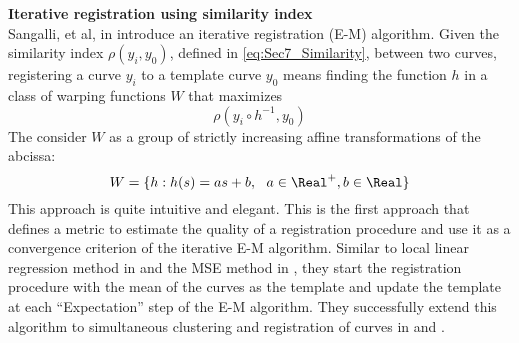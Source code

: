 \noindent
{\bf{Iterative registration using similarity index}} \\
Sangalli, et al, in \cite{Sangalli_etal_2009_JASA} introduce an iterative registration (E-M) algorithm. Given the similarity index $\rho(y_i, y_0)$, defined in \ref{eq:Sec7_Similarity}, between two curves, registering a curve $y_i$ to a template curve $y_0$ means finding the function $h$ in a class of warping functions $W$ that maximizes 
\[ \rho(y_i \circ h^{-1}, y_0)\]
The consider $W$ as a group of strictly increasing affine transformations of the abcissa:
\begin{equation}
W = \{h:h(s) = as + b,\ \ a \in \Real^{+}, b \in \Real  \}
\label{eq:3_affine}
\end{equation}
This approach is quite intuitive and elegant. This is the first approach that defines a metric to estimate the quality of a registration procedure and use it as a convergence criterion of the iterative E-M algorithm. Similar to local linear regression method in \cite{Kneip_etal_2000_CJS} and the MSE method in \cite{Ramsay_2006_Functional}, they start the registration procedure with the mean of the curves as the template and update the template at each ``Expectation'' step of the E-M algorithm. They successfully extend this algorithm to simultaneous clustering and registration of curves in \cite{Sangalli_etal_2010_CSDA} and \cite{Sangalli_etal_2014_EJS}. \\

